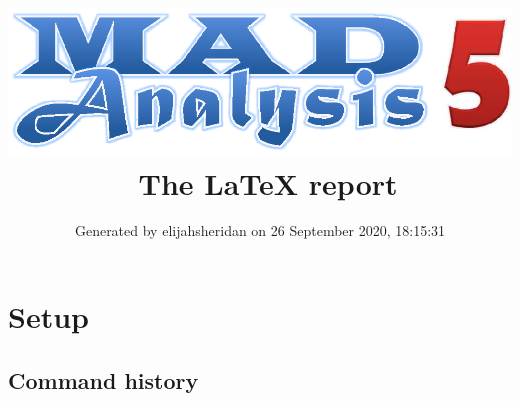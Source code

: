 \documentclass[a4paper, 10pt]{article}
\title{{\includegraphics[scale=.4]{logo.eps}}\ The LaTeX report}
\author{Generated by elijahsheridan on 26 September 2020, 18:15:31}
\begin{document}
\maketitle
\flushbottom

\newpage
\section{ Setup}

\subsection{ Command history}
\end{document}
